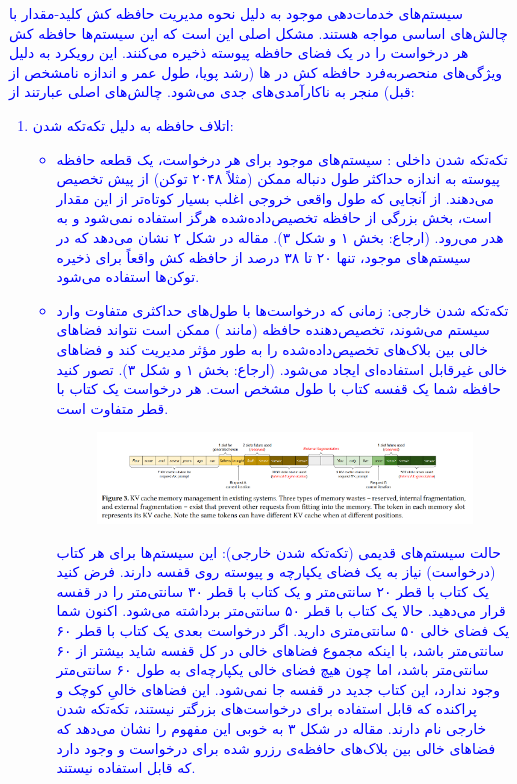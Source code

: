 \documentclass[12pt]{article}
\begin{document}
\begin{enumerate}
\begin{enumerate}
        \textcolor{blue}{
        سیستم‌های خدمات‌دهی  موجود به دلیل نحوه مدیریت حافظه کش کلید-مقدار  با چالش‌های اساسی مواجه هستند. مشکل اصلی این است که این سیستم‌ها حافظه کش  هر درخواست را در یک فضای حافظه پیوسته ذخیره می‌کنند. این رویکرد به دلیل ویژگی‌های منحصربه‌فرد حافظه کش  در ها (رشد پویا، طول عمر و اندازه نامشخص از قبل) منجر به ناکارآمدی‌های جدی می‌شود.
        چالش‌های اصلی عبارتند از:
        \begin{enumerate}
            \item اتلاف حافظه به دلیل تکه‌تکه شدن:
            \begin{itemize}
                \item تکه‌تکه شدن داخلی : سیستم‌های موجود برای هر درخواست، یک قطعه حافظه پیوسته به اندازه حداکثر طول دنباله ممکن (مثلاً ۲۰۴۸ توکن) از پیش تخصیص می‌دهند. از آنجایی که طول واقعی خروجی اغلب بسیار کوتاه‌تر از این مقدار است، بخش بزرگی از حافظه تخصیص‌داده‌شده هرگز استفاده نمی‌شود و به هدر می‌رود. (ارجاع: بخش ۱ و شکل ۳). مقاله در شکل ۲ نشان می‌دهد که در سیستم‌های موجود، تنها ۲۰ تا ۳۸ درصد از حافظه کش  واقعاً برای ذخیره توکن‌ها استفاده می‌شود.
                \item تکه‌تکه شدن خارجی: زمانی که درخواست‌ها با طول‌های حداکثری متفاوت وارد سیستم می‌شوند، تخصیص‌دهنده حافظه (مانند ) ممکن است نتواند فضاهای خالی بین بلاک‌های تخصیص‌داده‌شده را به طور مؤثر مدیریت کند و فضاهای خالی غیرقابل استفاده‌ای ایجاد می‌شود. (ارجاع: بخش ۱ و شکل ۳).
                تصور کنید حافظه  شما یک قفسه کتاب با طول مشخص است. هر درخواست یک کتاب با قطر متفاوت است.
                \begin{figure}[h]
                    \centering
                    \includegraphics[width=\textwidth]{figs/Q1_1.png}
                    \label{fig:num_pic}  
                \end{figure}
                حالت سیستم‌های قدیمی (تکه‌تکه شدن خارجی): این سیستم‌ها برای هر کتاب (درخواست) نیاز به یک فضای یکپارچه و پیوسته روی قفسه دارند. فرض کنید یک کتاب با قطر ۲۰ سانتی‌متر و یک کتاب با قطر ۳۰ سانتی‌متر را در قفسه قرار می‌دهید. حالا یک کتاب با قطر ۵۰ سانتی‌متر برداشته می‌شود. اکنون شما یک فضای خالی ۵۰ سانتی‌متری دارید. اگر درخواست بعدی یک کتاب با قطر ۶۰ سانتی‌متر باشد، با اینکه مجموع فضاهای خالی در کل قفسه شاید بیشتر از ۶۰ سانتی‌متر باشد، اما چون هیچ فضای خالی یکپارچه‌ای به طول ۶۰ سانتی‌متر وجود ندارد، این کتاب جدید در قفسه جا نمی‌شود. این فضاهای خالیِ کوچک و پراکنده که قابل استفاده برای درخواست‌های بزرگتر نیستند، تکه‌تکه شدن خارجی نام دارند. مقاله در شکل ۳ به خوبی این مفهوم را نشان می‌دهد که فضاهای خالی بین بلاک‌های حافظه‌ی رزرو شده برای درخواست  و  وجود دارد که قابل استفاده نیستند.

\end{itemize}
\end{enumerate}}
\end{enumerate}
\end{enumerate}
\end{document}
